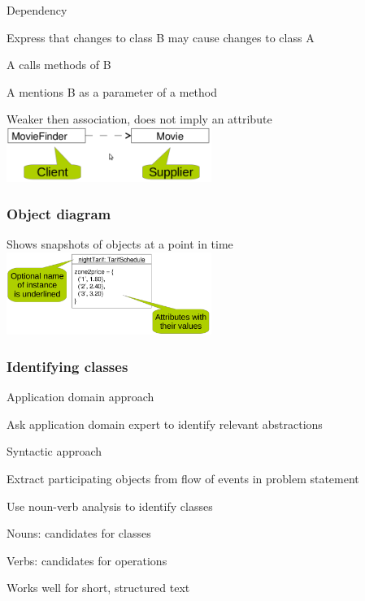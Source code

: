 	\item Dependency
	\enumstart
		\item Express that changes to class B may cause changes to class A
		\enumstart
			\item A calls methods of B
			\item A mentions B as a parameter of a method
		\enumend
		\item Weaker then association, does not imply an attribute
	\enumend
	\includegraphics[width=0.5\textwidth]{img/dependency.png}
\enumend

\subsubsection{Object diagram}
\enumstart
	\item Shows snapshots of objects at a point in time
	\\ \includegraphics[width=0.5\textwidth]{img/object_diagram.png}
\enumend

\subsubsection{Identifying classes}
\enumstart
	\item Application domain approach
	\enumstart
		\item Ask application domain expert to identify relevant abstractions
	\enumend

	\item Syntactic approach
	\enumstart
		\item Extract participating objects from flow of events in problem statement
		\item Use noun-verb analysis to identify classes
		\enumstart
			\item Nouns: candidates for classes
			\item Verbs: candidates for operations
			\item Works well for short, structured text
		\enumend
	\enumend

